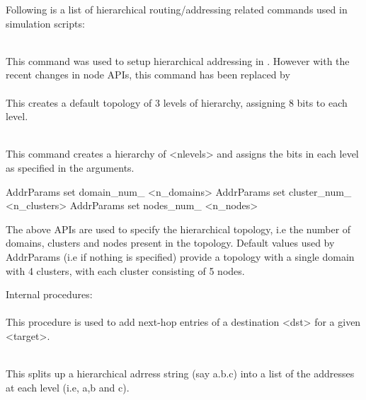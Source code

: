 Following is a list of hierarchical routing/addressing related commands
used in simulation scripts:
\begin{flushleft}
\\
This command was used to setup hierarchical addressing in \ns. However with
the recent changes in node APIs, this command has been replaced by\\
\\
This creates a default topology of 3 levels of hierarchy, assigning 8 bits
to each level.


\\
This command creates a hierarchy of <nlevels> and assigns the bits in each level
as specified in the arguments.


\begin{program}
AddrParams set domain_num_ <n_domains>
AddrParams set cluster_num_ <n_clusters>
AddrParams set nodes_num_ <n_nodes>
\end{program}
The above APIs are used to specify the hierarchical topology, i.e the number of
domains, clusters and nodes present in the topology. Default values used by
AddrParams (i.e if nothing is specified) provide a topology with a single
domain with 4 clusters, with each cluster consisting of 5 nodes.


Internal procedures:\\

\\
This procedure is used to add next-hop entries of a destination <dst> for a given <target>. 


\\
This splits up a hierarchical adrress string  (say a.b.c) into a list of
the addresses at each level (i.e, a,b and c).

\end{flushleft}

\endinput
